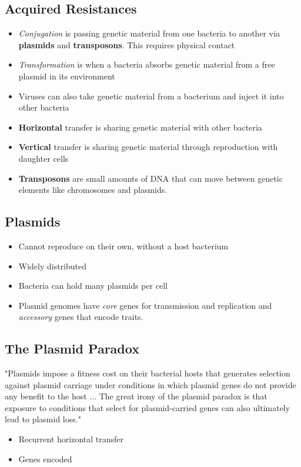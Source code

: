 \documentclass[oneside]{labbook}
\begin{document}
\subsection*{Acquired Resistances}
\begin{itemize}
  \item \textit{Conjugation} is passing genetic material from one bacteria to another via
  \textbf{plasmids} and \textbf{transposons}. This requires physical contact
  \item \textit{Transformation} is when a bacteria absorbs genetic material from
  a free plasmid in its environment
  \item Viruses can also take genetic material from a bacterium and inject it into other bacteria
  \item \textbf{Horizontal} transfer is sharing genetic material with other bacteria
  \item \textbf{Vertical} transfer is sharing genetic material through reproduction with daughter cells
  \item \textbf{Transposons} are small amounts of DNA that can move between genetic
  elements like chromosomes and plasmids.
\end{itemize}


\subsection*{Plasmids}
\begin{itemize}
  \item Cannot reproduce on their own, without a host bacterium
  \item Widely distributed
  \item Bacteria can hold many plasmids per cell
  \item Plasmid genomes have \textit{core} genes for transmission and replication
  and \textit{accessory} genes that encode traits.
\end{itemize}


\subsection*{The Plasmid Paradox}
"Plasmids impose a fitness cost on their bacterial hosts that generates selection
against plasmid carriage under conditions in which plasmid genes do not provide
any benefit to the host ... The great irony of the plasmid paradox is that exposure
to conditions that select for plasmid-carried genes can also ultimately lead to
plasmid loss."
\begin{itemize}
  \item Recurrent horizontal transfer
  \item Genes encoded
\end{itemize}
\end{document}
